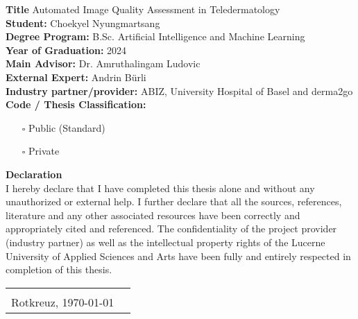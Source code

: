 \begin{titlepage}
\vspace{0.75cm}

\noindent\textbf{Title} Automated Image Quality Assessment in Teledermatology\\

\noindent\textbf{Student:} Choekyel Nyungmartsang\\

\noindent\textbf{Degree Program:} B.Sc. Artificial Intelligence and Machine Learning\\

\noindent\textbf{Year of Graduation:} 2024\\

\noindent\textbf{Main Advisor:} Dr. Amruthalingam Ludovic\\

\noindent\textbf{External Expert:} Andrin Bürli\\

\noindent\textbf{Industry partner/provider:} ABIZ, University Hospital of Basel and derma2go\\

\vspace{2em}
\noindent\textbf{Code / Thesis Classification:}
\begin{itemize}
	\item[\rlap{\raisebox{0.3ex}{\hspace{0.4ex}\tiny \ding{56}}}$\square$]
	Public (Standard)
	\item[$\square$]
	Private
\end{itemize}

\vspace{3em}
\noindent
\textbf{Declaration}\\
I hereby declare that I have completed this thesis alone and without any unauthorized or external help. I further declare that all the sources, references, literature and any other associated resources have been correctly and appropriately cited and referenced. The confidentiality of the project provider (industry partner) as well as the intellectual property rights of the Lucerne University of Applied Sciences and Arts have been fully and entirely respected in completion of this thesis.\\
\begin{tabularx}{\textwidth}{@{}lX}
	&\\
	Rotkreuz, \today &  \\
	\cline{2-2}
\end{tabularx}


\end{titlepage}
